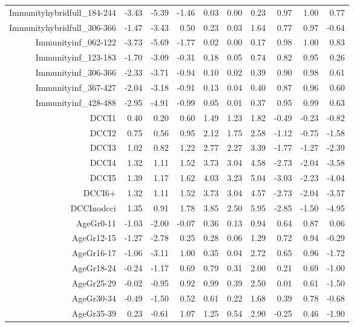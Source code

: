 \begin{table}[ht]
\begin{tabular}{rrrrrrrrrr}
  Immunityhybridfull\_184-244 & -3.43 & -5.39 & -1.46 & 0.03 & 0.00 & 0.23 & 0.97 & 1.00 & 0.77 \\ 
  Immunityhybridfull\_306-366 & -1.47 & -3.43 & 0.50 & 0.23 & 0.03 & 1.64 & 0.77 & 0.97 & -0.64 \\ 
  Immunityinf\_062-122 & -3.73 & -5.69 & -1.77 & 0.02 & 0.00 & 0.17 & 0.98 & 1.00 & 0.83 \\ 
  Immunityinf\_123-183 & -1.70 & -3.09 & -0.31 & 0.18 & 0.05 & 0.74 & 0.82 & 0.95 & 0.26 \\ 
  Immunityinf\_306-366 & -2.33 & -3.71 & -0.94 & 0.10 & 0.02 & 0.39 & 0.90 & 0.98 & 0.61 \\ 
  Immunityinf\_367-427 & -2.04 & -3.18 & -0.91 & 0.13 & 0.04 & 0.40 & 0.87 & 0.96 & 0.60 \\ 
  Immunityinf\_428-488 & -2.95 & -4.91 & -0.99 & 0.05 & 0.01 & 0.37 & 0.95 & 0.99 & 0.63 \\ 
  DCCI1 & 0.40 & 0.20 & 0.60 & 1.49 & 1.23 & 1.82 & -0.49 & -0.23 & -0.82 \\ 
  DCCI2 & 0.75 & 0.56 & 0.95 & 2.12 & 1.75 & 2.58 & -1.12 & -0.75 & -1.58 \\ 
  DCCI3 & 1.02 & 0.82 & 1.22 & 2.77 & 2.27 & 3.39 & -1.77 & -1.27 & -2.39 \\ 
  DCCI4 & 1.32 & 1.11 & 1.52 & 3.73 & 3.04 & 4.58 & -2.73 & -2.04 & -3.58 \\ 
  DCCI5 & 1.39 & 1.17 & 1.62 & 4.03 & 3.23 & 5.04 & -3.03 & -2.23 & -4.04 \\ 
  DCCI6+ & 1.32 & 1.11 & 1.52 & 3.73 & 3.04 & 4.57 & -2.73 & -2.04 & -3.57 \\ 
  DCCInodcci & 1.35 & 0.91 & 1.78 & 3.85 & 2.50 & 5.95 & -2.85 & -1.50 & -4.95 \\ 
  AgeGr0-11 & -1.03 & -2.00 & -0.07 & 0.36 & 0.13 & 0.94 & 0.64 & 0.87 & 0.06 \\ 
  AgeGr12-15 & -1.27 & -2.78 & 0.25 & 0.28 & 0.06 & 1.29 & 0.72 & 0.94 & -0.29 \\ 
  AgeGr16-17 & -1.06 & -3.11 & 1.00 & 0.35 & 0.04 & 2.72 & 0.65 & 0.96 & -1.72 \\ 
  AgeGr18-24 & -0.24 & -1.17 & 0.69 & 0.79 & 0.31 & 2.00 & 0.21 & 0.69 & -1.00 \\ 
  AgeGr25-29 & -0.02 & -0.95 & 0.92 & 0.99 & 0.39 & 2.50 & 0.01 & 0.61 & -1.50 \\ 
  AgeGr30-34 & -0.49 & -1.50 & 0.52 & 0.61 & 0.22 & 1.68 & 0.39 & 0.78 & -0.68 \\ 
  AgeGr35-39 & 0.23 & -0.61 & 1.07 & 1.25 & 0.54 & 2.90 & -0.25 & 0.46 & -1.90 \\ 

\end{tabular}
\end{table}
